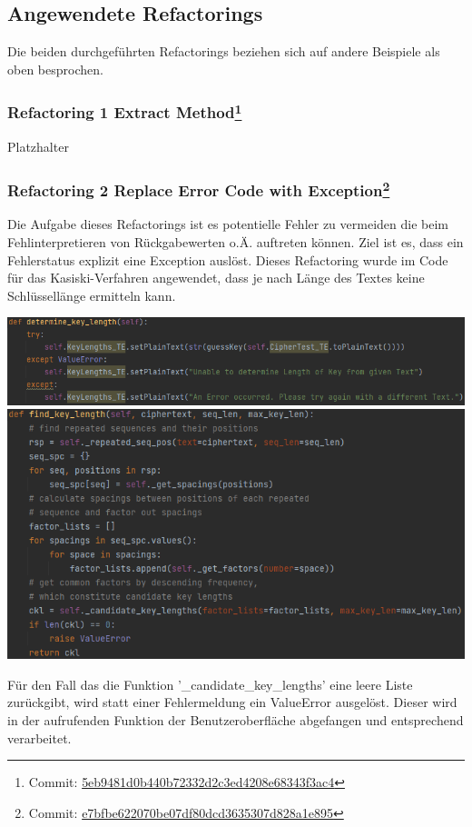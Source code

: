 \documentclass[12pt]{article}
\begin{document}
\subsection{Angewendete Refactorings}
Die beiden durchgeführten Refactorings beziehen sich auf andere Beispiele als oben besprochen.

\subsubsection[Refactoring 1 Extract Method]{Refactoring 1 Extract Method\protect\footnote{Commit: \href{https://github.com/NicoSchrodt/EncryptionService/commit/5eb9481d0b440b72332d2c3ed4208e68343f3ac4}{5eb9481d0b440b72332d2c3ed4208e68343f3ac4}}}
Platzhalter

\subsubsection[Refactoring 2 Replace Error Code with Exception]{Refactoring 2 Replace Error Code with Exception\protect\footnote{Commit: \href{https://github.com/NicoSchrodt/EncryptionService/commit/e7bfbe622070be07df80dcd3635307d828a1e895}{e7bfbe622070be07df80dcd3635307d828a1e895}}}
Die Aufgabe dieses Refactorings ist es potentielle Fehler zu vermeiden die beim Fehlinterpretieren von Rückgabewerten o.Ä. auftreten können. Ziel ist es, dass ein Fehlerstatus explizit eine Exception auslöst. Dieses Refactoring wurde im Code für das Kasiski-Verfahren angewendet, dass je nach Länge des Textes keine Schlüssellänge ermitteln kann.
\begin{center}
	\includegraphics[width=15cm]{bilder/Refactoring2_b.png}
	\includegraphics[width=15cm]{bilder/Refactoring2_a.png}
\end{center}
Für den Fall das die Funktion '\_candidate\_key\_lengths' eine leere Liste zurückgibt, wird statt einer Fehlermeldung ein ValueError ausgelöst. Dieser wird in der aufrufenden Funktion der Benutzeroberfläche abgefangen und entsprechend verarbeitet.
\newpage
\end{document}
